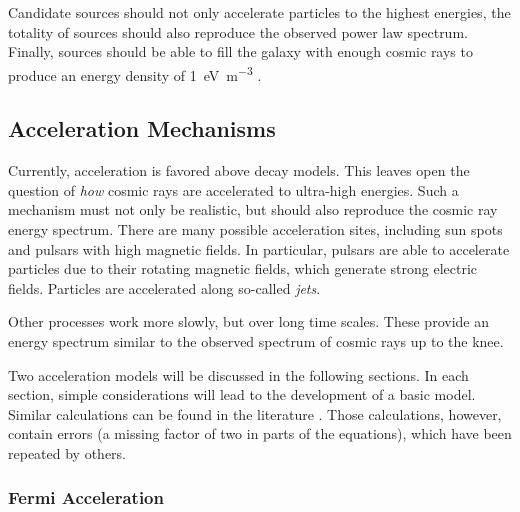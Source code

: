 Candidate sources should not only accelerate particles to the highest
energies, the totality of sources should also reproduce the observed power law
spectrum.
Finally, sources should be able to fill the galaxy with enough cosmic rays to
produce an energy density of \SI{1}{\electronvolt\per\meter\cubed}
\cite[11]{Gaisser:1990}.


\subsection{Acceleration Mechanisms}

Currently, acceleration is favored above decay models.  This leaves open
the question of \emph{how} cosmic rays are accelerated to ultra-high energies.
Such a mechanism must not only be realistic, but should also reproduce the
cosmic ray energy spectrum.  There are many possible acceleration sites, including sun
spots and pulsars with high magnetic fields.
In particular, pulsars are able to accelerate particles due to
their rotating magnetic fields, which generate strong electric fields.
Particles are accelerated along so-called \emph{jets}.

Other processes work more slowly, but over long time scales.  These provide an
energy spectrum similar to the observed spectrum of cosmic rays up to the knee.

Two acceleration models will be discussed in the following sections. In
each section, simple considerations will lead to the development of a
basic model. Similar calculations can be found in the literature
\cite[67--68]{Grupen:2005}. Those calculations, however, contain errors (a
missing factor of two in parts of the equations), which have been repeated
by others.


\subsubsection{Fermi Acceleration}

